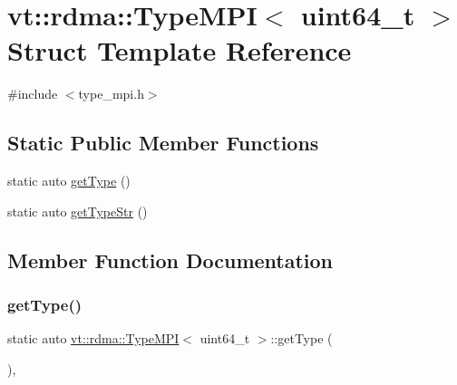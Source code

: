 \hypertarget{structvt_1_1rdma_1_1_type_m_p_i_3_01uint64__t_01_4}{}\section{vt\+:\+:rdma\+:\+:Type\+M\+PI$<$ uint64\+\_\+t $>$ Struct Template Reference}
\label{structvt_1_1rdma_1_1_type_m_p_i_3_01uint64__t_01_4}


{\ttfamily \#include $<$type\+\_\+mpi.\+h$>$}

\subsection*{Static Public Member Functions}
\begin{DoxyCompactItemize}
\item 
static auto \hyperlink{structvt_1_1rdma_1_1_type_m_p_i_3_01uint64__t_01_4_aa051ae228a286dd58f4efecc4fa68f9c}{get\+Type} ()
\item 
static auto \hyperlink{structvt_1_1rdma_1_1_type_m_p_i_3_01uint64__t_01_4_a61515144d0ef554cb83e6e48115bb7c5}{get\+Type\+Str} ()
\end{DoxyCompactItemize}


\subsection{Member Function Documentation}
\mbox{\label{structvt_1_1rdma_1_1_type_m_p_i_3_01uint64__t_01_4_aa051ae228a286dd58f4efecc4fa68f9c}} 
\subsubsection{\texorpdfstring{get\+Type()}{getType()}}
{\footnotesize\ttfamily static auto \hyperlink{structvt_1_1rdma_1_1_type_m_p_i}{vt\+::rdma\+::\+Type\+M\+PI}$<$ uint64\+\_\+t $>$\+::get\+Type (\begin{DoxyParamCaption}{ }\end{DoxyParamCaption})\hspace{0.3cm}{\ttfamily [inline]}, {\ttfamily [static]}}

